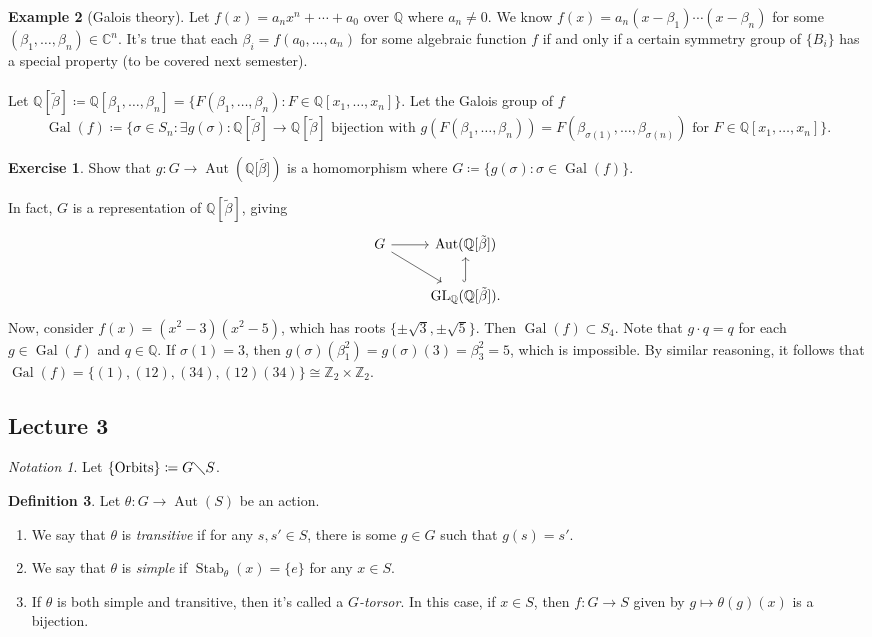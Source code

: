 \documentclass[10pt,letterpaper,cm]{nupset}
\theoremstyle{definition}
\newtheorem{definition}{Definition}[subsection]
\newtheorem{exmp}[definition]{Example}
\theoremstyle{theorem}
\newtheorem{exercise}[definition]{Exercise}
\theoremstyle{remark}
\newtheorem*{notation}{Notation}
\newcommand{\C}{\mathbb C}
\newcommand{\Q}{\mathbb Q}
\newcommand{\Z}{\mathbb Z}
\newcommand{\1}{\mathbf{1}}
\newcommand{\0}{\vec 0}
\DeclareMathOperator*{\GL}{GL}
\DeclareMathOperator{\gal}{Gal}
\DeclareMathOperator{\aut}{Aut}
\DeclareMathOperator{\stab}{Stab}
\begin{document}
\begin{exmp}[Galois theory]
Let $f(x) = a_nx^n + \cdots + a_0$ over $\Q$ where $a_n \ne 0$. We know $f(x) = a_n(x-\beta_1)\cdots (x-\beta_n)$ for some $(\beta_1, \ldots, \beta_n) \in \C^n$. It's true that each $\beta_i = f(a_0, \ldots, a_n)$ for some algebraic function $f$  if and only if a certain symmetry group of $\{B_i\}$ has a special property (to be covered next semester).
\\ \\ Let $\Q[\tilde{\beta}]\coloneqq  \Q[\beta_1, \ldots, \beta_n] = \{F(\beta_1, \ldots, \beta_n) : F \in \Q[x_1, \ldots, x_n]\}$. Let the Galois group of $f$ $$\gal(f)\coloneqq  \{\sigma \in S_n : \exists g(\sigma) : \Q[\tilde{\beta}] \to \Q[\tilde{\beta}] \text{ bijection with } g(F(\beta_1, \ldots, \beta_n)) = F(\beta_{\sigma(1)}, \ldots, \beta_{\sigma(n)}) \text{ for } F \in \Q[x_1, \ldots, x_n]\}.$$

\begin{exercise}
Show that $g: G \to \aut(\Q[\tilde{\beta]})$ is a homomorphism where $G \coloneqq  \{g(\sigma): \sigma \in \gal(f)\}$.
\end{exercise}
In fact, $G$ is a representation of $\Q[\tilde{\beta}]$, giving
\[ \begin{tikzcd}
G \arrow{r} \arrow[swap]{dr} & \aut(\Q[\tilde{\beta}]) \\%
 & \GL_\Q(\Q[\tilde{\beta}]) \arrow[hookrightarrow]{u}.
\end{tikzcd}
\]
Now, consider $f(x) = (x^2 -3)(x^2 -5)$, which has roots $\{\pm \sqrt{3}, \pm \sqrt{5}\}$. Then $\gal(f) \subset S_4$. Note that $g\cdot q= q$ for each $g \in \gal(f)$ and $q\in \Q$. If $\sigma(1) =3$, then $g(\sigma)(\beta_1^2) = g(\sigma)  (3) = \beta_3^2 = 5$, which is impossible. By similar reasoning, it follows that $\gal(f) = \{(1), (1 2), (3 4), (1 2)(3 4)\} \cong \Z_2 \times \Z_2$.
\end{exmp}

\subsection{Lecture 3}

\begin{notation}
Let $\{\text{Orbits}\} \coloneqq  G \diagdown S$.
\end{notation}

\begin{definition} Let $\theta: G \to \aut(S)$ be an action.
\begin{enumerate}
\item We say that  $\theta$ is \textit{transitive} if for any $s, s' \in S$, there is some $g \in G$ such that $g(s) = s'$. 
\item We say that $\theta$ is \textit{simple} if $\stab_\theta(x) = \{e\}$ for any $x \in S$.
\item If $\theta$ is both simple and transitive, then it's called a \textit{$G$-torsor}. In this case, if $x \in S$, then $f: G \to S$ given by $g\mapsto \theta(g)(x)$ is a bijection.
\end{enumerate}
\end{definition}
\end{document}
